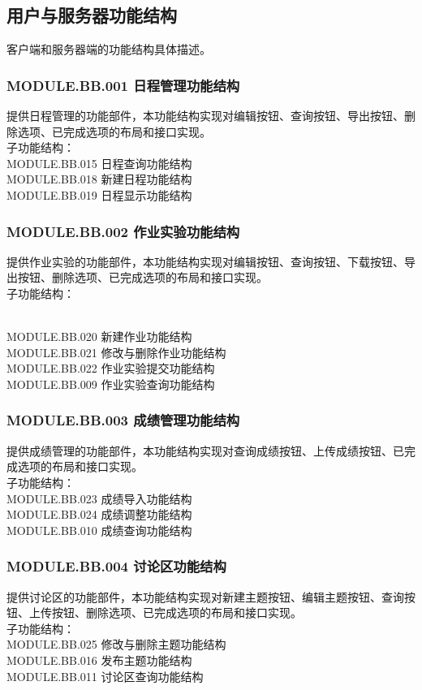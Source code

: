 \subsection{用户与服务器功能结构}

客户端和服务器端的功能结构具体描述。

\subsubsection{MODULE.BB.001    日程管理功能结构}  
提供日程管理的功能部件，本功能结构实现对编辑按钮、查询按钮、导出按钮、删除选项、已完成选项的布局和接口实现。
\\子功能结构：
\\MODULE.BB.015 日程查询功能结构
\\MODULE.BB.018 新建日程功能结构
\\MODULE.BB.019 日程显示功能结构

\subsubsection{MODULE.BB.002    作业实验功能结构}
提供作业实验的功能部件，本功能结构实现对编辑按钮、查询按钮、下载按钮、导出按钮、删除选项、已完成选项的布局和接口实现。
\\子功能结构：

\\MODULE.BB.020 新建作业功能结构   
\\MODULE.BB.021 修改与删除作业功能结构
\\MODULE.BB.022 作业实验提交功能结构 
\\MODULE.BB.009 作业实验查询功能结构

\subsubsection{MODULE.BB.003    成绩管理功能结构}
提供成绩管理的功能部件，本功能结构实现对查询成绩按钮、上传成绩按钮、已完成选项的布局和接口实现。
\\子功能结构：
\\MODULE.BB.023 成绩导入功能结构
\\MODULE.BB.024 成绩调整功能结构
\\MODULE.BB.010 成绩查询功能结构


\subsubsection{MODULE.BB.004    讨论区功能结构}
提供讨论区的功能部件，本功能结构实现对新建主题按钮、编辑主题按钮、查询按钮、上传按钮、删除选项、已完成选项的布局和接口实现。
\\子功能结构：
\\MODULE.BB.025 修改与删除主题功能结构
\\MODULE.BB.016 发布主题功能结构 
\\MODULE.BB.011 讨论区查询功能结构

